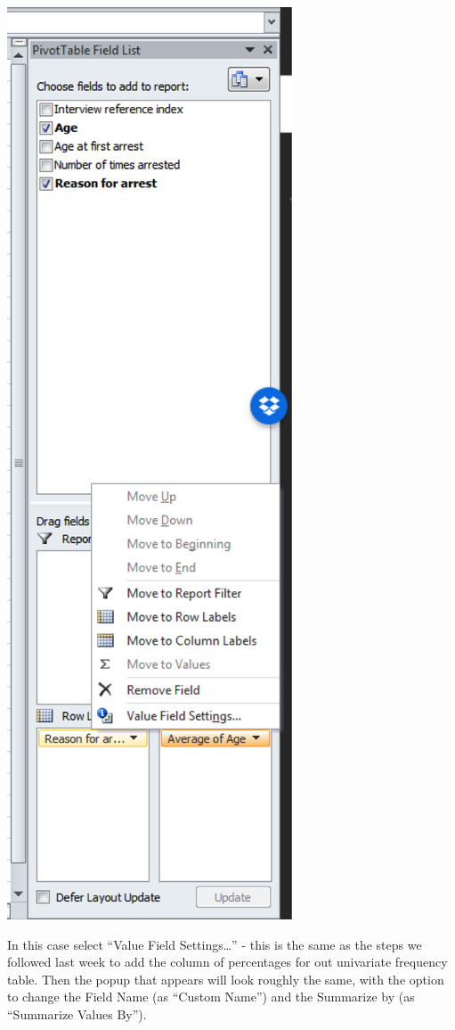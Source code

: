 \documentclass[]{book}
\theoremstyle{definition}
\theoremstyle{definition}
\theoremstyle{definition}
\theoremstyle{remark}
\begin{document}
\includegraphics{imgs/windows_pivot_change_sum.png}

In this case select ``Value Field Settings\ldots{}'' - this is the same
as the steps we followed last week to add the column of percentages for
out univariate frequency table. Then the popup that appears will look
roughly the same, with the option to change the Field Name (as ``Custom
Name'') and the Summarize by (as ``Summarize Values By'').
\end{document}
